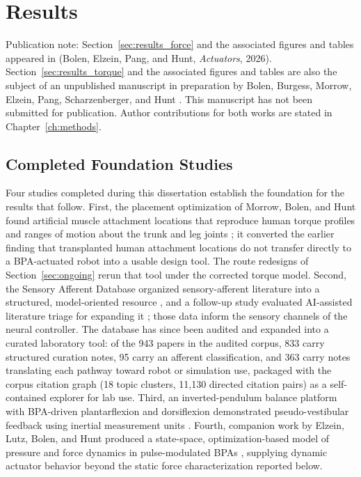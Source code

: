 \chapter{Results}\label{ch:results}
\graphicspath{{figs/30-results/}}

{\doublespacing\normalsize\upshape
\noindent Publication note: Section~\ref{sec:results_force} and the associated figures and tables appeared in \citet{bolen_2026} (Bolen, Elzein, Pang, and Hunt, \emph{Actuators}, 2026). Section~\ref{sec:results_torque} and the associated figures and tables are also the subject of an unpublished manuscript in preparation by Bolen, Burgess, Morrow, Elzein, Pang, Scharzenberger, and Hunt \citep{bolen_isometric_2025}. This manuscript has not been submitted for publication. Author contributions for both works are stated in Chapter~\ref{ch:methods}.\par}

\section{Completed Foundation Studies}\label{sec:foundation}

Four studies completed during this dissertation establish the foundation for the results that follow. First, the placement optimization of Morrow, Bolen, and Hunt found artificial muscle attachment locations that reproduce human torque profiles and ranges of motion about the trunk and leg joints \citep{morrow_optimization_2020}; it converted the earlier finding that transplanted human attachment locations do not transfer directly to a BPA-actuated robot \citep{bolen_bipedal_2019, bolen_determination_2019} into a usable design tool. The route redesigns of Section~\ref{sec:ongoing} rerun that tool under the corrected torque model. Second, the Sensory Afferent Database organized sensory-afferent literature into a structured, model-oriented resource \citep{bolen_sensory_2023}, and a follow-up study evaluated AI-assisted literature triage for expanding it \citep{bolen_using_2024}; those data inform the sensory channels of the neural controller. The database has since been audited and expanded into a curated laboratory tool: of the 943 papers in the audited corpus, 833 carry structured curation notes, 95 carry an afferent classification, and 363 carry notes translating each pathway toward robot or simulation use, packaged with the corpus citation graph (18 topic clusters, 11,130 directed citation pairs) as a self-contained explorer for lab use. Third, an inverted-pendulum balance platform with BPA-driven plantarflexion and dorsiflexion demonstrated pseudo-vestibular feedback using inertial measurement units \citep{bolen_balance_2024, bolen_selfbalancing_2024, bolen_selfbalancing_srs_2024}. Fourth, companion work by Elzein, Lutz, Bolen, and Hunt produced a state-space, optimization-based model of pressure and force dynamics in pulse-modulated BPAs \citep{elzein_pressure_2025}, supplying dynamic actuator behavior beyond the static force characterization reported below.

